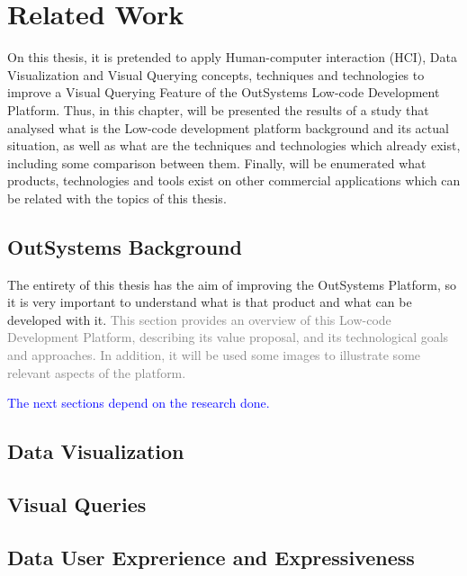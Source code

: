 \chapter{Related Work}
\label{cha:related_work}
On this thesis, it is pretended to apply Human-computer interaction (HCI), Data 
Visualization and Visual Querying concepts, techniques and technologies to improve 
a Visual Querying Feature of the OutSystems Low-code Development Platform. Thus, 
in this chapter, will be presented the results of a study that analysed what is 
the Low-code development platform background and its actual situation, as well as 
what are the techniques and technologies which already exist, including some 
comparison between them. Finally, will be enumerated what products, technologies 
and tools exist on other commercial applications which can be related with the 
topics of this thesis.

\section{OutSystems Background}
\label{sec:outsystems_background}
The entirety of this thesis has the aim of improving the OutSystems Platform, so it is 
very important to understand what is that product and what can be developed with 
it.
\textcolor{gray}{This section provides an overview of this Low-code Development Platform, 
describing its value proposal, and its technological goals and approaches. In 
addition, it will be used some images to illustrate some relevant aspects of the 
platform.}

\textcolor{blue}{The next sections depend on the research done.}

\section{Data Visualization}
\label{sec:data_visualization}

\section{Visual Queries}
\label{sec:visual_queries}

\section{Data User Exprerience and Expressiveness}
\label{sec:data_user_experience_and_expressiveness}

